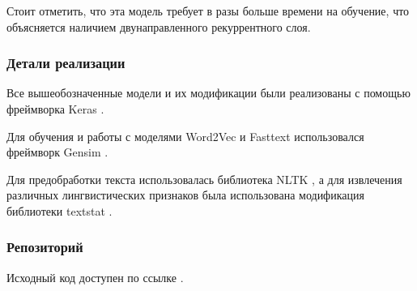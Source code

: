 \documentclass[../diploma.tex]{subfiles}
\begin{document}
   	Стоит отметить, что эта модель требует в разы больше времени на обучение, что объясняется наличием двунаправленного рекуррентного слоя.
	
	\subsubsection{Детали реализации}

 	Все вышеобозначенные модели и их модификации были реализованы с помощью фреймворка Keras \cite{online:keras}.

 	Для обучения и работы с моделями Word2Vec и Fasttext использовался фреймворк Gensim \cite{online:gensim}.

 	Для предобработки текста использовалась библиотека NLTK \cite{online:nltk}, 
 	а для извлечения различных лингвистических признаков была использована модификация библиотеки textstat \cite{online:textstat}.

 	\subsubsection{Репозиторий}

 	Исходный код доступен по ссылке \cite{online:repository}.
\end{document}
